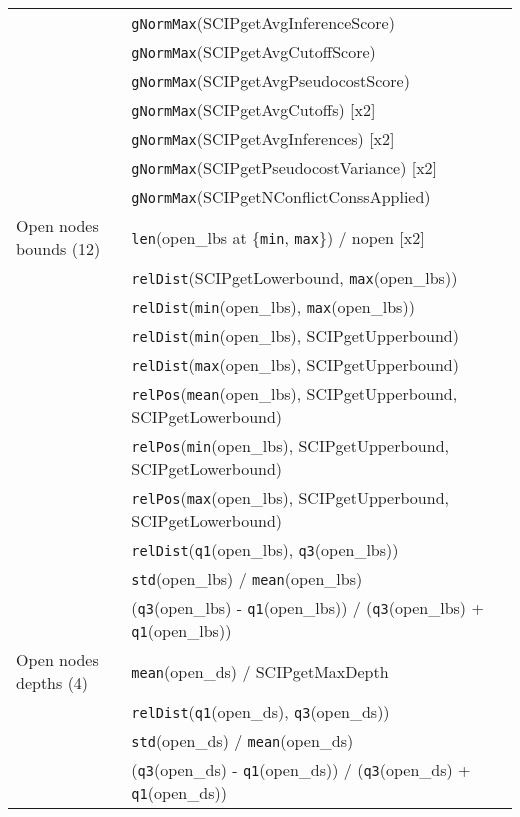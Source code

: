 \documentclass[letterpaper]{article} %
\begin{document}
\begin{center}
\begin{footnotesize}
\begin{longtable}{ll}
& \texttt{gNormMax}(SCIPgetAvgInferenceScore) \\
& \texttt{gNormMax}(SCIPgetAvgCutoffScore) \\
& \texttt{gNormMax}(SCIPgetAvgPseudocostScore) \\
& \texttt{gNormMax}(SCIPgetAvgCutoffs) [x2]\\
& \texttt{gNormMax}(SCIPgetAvgInferences) [x2] \\
& \texttt{gNormMax}(SCIPgetPseudocostVariance) [x2] \\
& \texttt{gNormMax}(SCIPgetNConflictConssApplied)\\
Open nodes bounds (12) & \texttt{len}(open\_lbs at \{\texttt{min}, \texttt{max}\}) / nopen [x2]\\
& \texttt{relDist}(SCIPgetLowerbound, \texttt{max}(open\_lbs))\\
& \texttt{relDist}(\texttt{min}(open\_lbs), \texttt{max}(open\_lbs))\\
& \texttt{relDist}(\texttt{min}(open\_lbs), SCIPgetUpperbound) \\
& \texttt{relDist}(\texttt{max}(open\_lbs), SCIPgetUpperbound) \\
& \texttt{relPos}(\texttt{mean}(open\_lbs), SCIPgetUpperbound, SCIPgetLowerbound) \\
& \texttt{relPos}(\texttt{min}(open\_lbs), SCIPgetUpperbound, SCIPgetLowerbound) \\
& \texttt{relPos}(\texttt{max}(open\_lbs), SCIPgetUpperbound, SCIPgetLowerbound) \\
& \texttt{relDist}(\texttt{q1}(open\_lbs), \texttt{q3}(open\_lbs))\\
& \texttt{std}(open\_lbs) / \texttt{mean}(open\_lbs) \\
& (\texttt{q3}(open\_lbs) - \texttt{q1}(open\_lbs)) / (\texttt{q3}(open\_lbs) + \texttt{q1}(open\_lbs)) \\
Open nodes depths (4) & \texttt{mean}(open\_ds) / SCIPgetMaxDepth \\
& \texttt{relDist}(\texttt{q1}(open\_ds), \texttt{q3}(open\_ds))\\
& \texttt{std}(open\_ds) / \texttt{mean}(open\_ds) \\
& (\texttt{q3}(open\_ds) - \texttt{q1}(open\_ds)) / (\texttt{q3}(open\_ds) + \texttt{q1}(open\_ds))\\
\end{longtable}
\end{footnotesize}
\end{center}
\twocolumn
\end{document}
